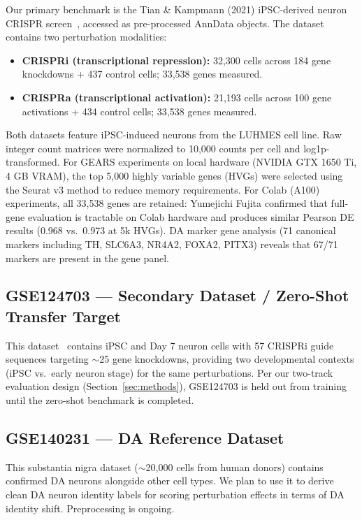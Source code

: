 \documentclass[11pt,letterpaper]{article}
\begin{document}
Our primary benchmark is the Tian \& Kampmann (2021) iPSC-derived neuron CRISPR screen~\cite{tian2021},
accessed as pre-processed AnnData objects. The dataset contains two perturbation modalities:

\begin{itemize}[noitemsep]
  \item \textbf{CRISPRi (transcriptional repression):} 32,300 cells across 184 gene knockdowns
        + 437 control cells; 33,538 genes measured.
  \item \textbf{CRISPRa (transcriptional activation):} 21,193 cells across 100 gene activations
        + 434 control cells; 33,538 genes measured.
\end{itemize}

Both datasets feature iPSC-induced neurons from the LUHMES cell line. Raw integer count matrices
were normalized to 10,000 counts per cell and log1p-transformed. For GEARS experiments on local
hardware (NVIDIA GTX 1650 Ti, 4 GB VRAM), the top 5,000 highly variable genes (HVGs) were
selected using the Seurat v3 method to reduce memory requirements. For Colab (A100) experiments,
all 33,538 genes are retained: Yumejichi Fujita confirmed that full-gene evaluation is tractable
on Colab hardware and produces similar Pearson DE results (0.968 vs.\ 0.973 at 5k HVGs). DA
marker gene analysis (71 canonical markers including TH, SLC6A3, NR4A2, FOXA2, PITX3) reveals
that 67/71 markers are present in the gene panel.

\subsection{GSE124703 --- Secondary Dataset / Zero-Shot Transfer Target}

This dataset~\cite{tian2019} contains iPSC and Day 7 neuron cells with 57 CRISPRi guide
sequences targeting $\sim$25 gene knockdowns, providing two developmental contexts (iPSC vs.\
early neuron stage) for the same perturbations. Per our two-track evaluation design
(Section~\ref{sec:methods}), GSE124703 is held out from training until the zero-shot benchmark
is completed.

\subsection{GSE140231 --- DA Reference Dataset}

This substantia nigra dataset ($\sim$20,000 cells from human donors) contains confirmed DA
neurons alongside other cell types. We plan to use it to derive clean DA neuron identity labels
for scoring perturbation effects in terms of DA identity shift. Preprocessing is ongoing.
\end{document}
